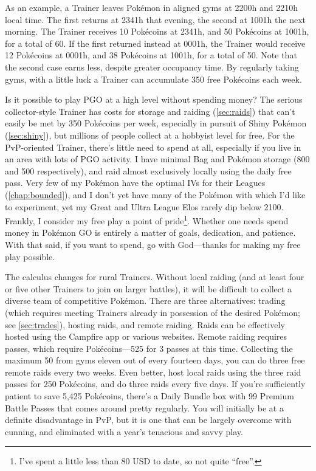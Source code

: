 As an example, a Trainer leaves Pokémon in aligned gyms at 2200h and 2210h local time.
The first returns at 2341h that evening, the second at 1001h the next morning.
The Trainer receives 10 Pokécoins at 2341h, and 50 Pokécoins at 1001h, for a total of 60.
If the first returned instead at 0001h, the Trainer would receive 12 Pokécoins at 0001h,
  and 38 Pokécoins at 1001h, for a total of 50.
Note that the second case earns less, despite greater occupancy time.
By regularly taking gyms, with a little luck a Trainer can accumulate 350 free Pokécoins each week.

Is it possible to play PGO at a high level without spending money?
The serious collector-style Trainer has costs for storage and raiding (\autoref{sec:raids})
  that can't easily be met by 350 Pokécoins per week, especially
  in pursuit of Shiny Pokémon (\autoref{sec:shiny}),
  but millions of people collect at a hobbyist level for free.
For the PvP-oriented Trainer, there's little need to spend at all,
  especially if you live in an area with lots of PGO activity.
I have minimal Bag and Pokémon storage (800 and 500 respectively), and raid almost exclusively locally using the daily free pass.
Very few of my Pokémon have the optimal IVs for their Leagues (\autoref{chap:bounded}),
  and I don't yet have many of the Pokémon with which I'd like to experiment,
  yet my Great and Ultra League Elos rarely dip below 2100.
Frankly, I consider my free play a point of pride\footnote{I've spent a little less than 80 USD to date, so not quite ``free''.}.
Whether one needs spend money in Pokémon GO is entirely a matter of goals, dedication, and patience.
With that said, if you want to spend, go with God---thanks for making my free play possible.

The calculus changes for rural Trainers.
Without local raiding (and at least four or five other Trainers to join on larger battles),
  it will be difficult to collect a diverse team of competitive Pokémon.
There are three alternatives: trading (which requires meeting Trainers already in possession of the desired Pokémon;
  see \autoref{sec:trades}), hosting raids, and remote raiding.
Raids can be effectively hosted using the Campfire app or various websites.
Remote raiding requires passes, which require Pokécoins---525 for 3 passes at this time.
Collecting the maximum 50 from gyms eleven out of every fourteen days, you can do
  three free remote raids every two weeks.
Even better, host local raids using the three raid passes for 250 Pokécoins, and
 do three raids every five days.
If you're sufficiently patient to save 5,425 Pokécoins, there's a Daily Bundle box
 with 99 Premium Battle Passes that comes around pretty regularly.
You will initially be at a definite disadvantage in PvP, but it is one that can
  be largely overcome with cunning, and eliminated with a year's tenacious
  and savvy play.

